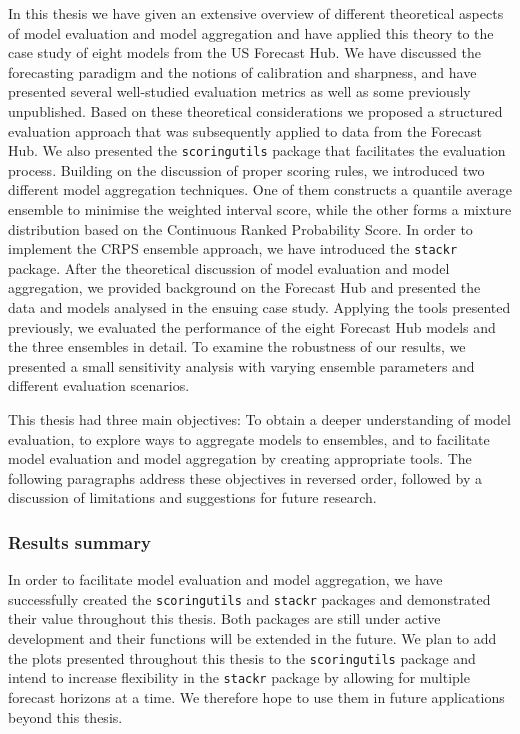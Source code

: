 \documentclass[
]{book}
\begin{document}
In this thesis we have given an extensive overview of different theoretical aspects of model evaluation and model aggregation and have applied this theory to the case study of eight models from the US Forecast Hub. We have discussed the forecasting paradigm and the notions of calibration and sharpness, and have presented several well-studied evaluation metrics as well as some previously unpublished. Based on these theoretical considerations we proposed a structured evaluation approach that was subsequently applied to data from the Forecast Hub. We also presented the \texttt{scoringutils} package that facilitates the evaluation process. Building on the discussion of proper scoring rules, we introduced two different model aggregation techniques. One of them constructs a quantile average ensemble to minimise the weighted interval score, while the other forms a mixture distribution based on the Continuous Ranked Probability Score. In order to implement the CRPS ensemble approach, we have introduced the \texttt{stackr} package. After the theoretical discussion of model evaluation and model aggregation, we provided background on the Forecast Hub and presented the data and models analysed in the ensuing case study. Applying the tools presented previously, we evaluated the performance of the eight Forecast Hub models and the three ensembles in detail. To examine the robustness of our results, we presented a small sensitivity analysis with varying ensemble parameters and different evaluation scenarios.

This thesis had three main objectives: To obtain a deeper understanding of model evaluation,
to explore ways to aggregate models to ensembles, and to facilitate model evaluation and model
aggregation by creating appropriate tools. The following paragraphs address these objectives in reversed order, followed by a discussion of limitations and suggestions for future research.

\hypertarget{results-summary}{%
\subsubsection*{Results summary}\label{results-summary}}

In order to facilitate model evaluation and model aggregation, we have successfully created the \texttt{scoringutils} and \texttt{stackr} packages and demonstrated their value throughout this thesis. Both packages are still under active development and their functions will be extended in the future. We plan to add the plots presented throughout this thesis to the \texttt{scoringutils} package and intend to increase flexibility in the \texttt{stackr} package by allowing for multiple forecast horizons at a time. We therefore hope to use them in future applications beyond this thesis.
\end{document}
